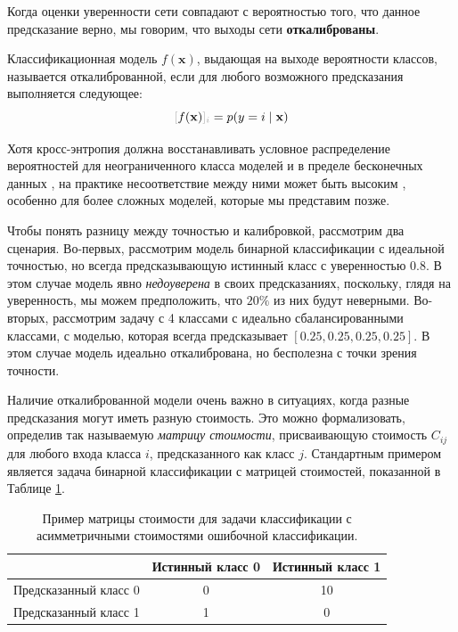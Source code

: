 Когда оценки уверенности сети совпадают с вероятностью того, что данное предсказание верно, мы говорим, что выходы сети \textbf{откалиброваны}.

\begin{definition}[Калибровка]
Классификационная модель $f(\mathbf{x})$, выдающая на выходе вероятности классов, называется откалиброванной, если для любого возможного предсказания выполняется следующее:
%
$$
\idx{f(\mathbf{x})}{i} = p(y=i \;\vert\; \mathbf{x})
$$
%
\end{definition}

Хотя кросс-энтропия должна восстанавливать условное распределение вероятностей для неограниченного класса моделей и в пределе бесконечных данных \cite{hastie2009elements}, на практике несоответствие между ними может быть высоким \cite{blasiok2024does}, особенно для более сложных моделей, которые мы представим позже.

Чтобы понять разницу между точностью и калибровкой, рассмотрим два сценария. Во-первых, рассмотрим модель бинарной классификации с идеальной точностью, но всегда предсказывающую истинный класс с уверенностью $0.8$. В этом случае модель явно \textit{недоуверена} в своих предсказаниях, поскольку, глядя на уверенность, мы можем предположить, что $20\%$ из них будут неверными. Во-вторых, рассмотрим задачу с 4 классами с идеально сбалансированными классами, с моделью, которая всегда предсказывает $[0.25, 0.25, 0.25, 0.25]$. В этом случае модель идеально откалибрована, но бесполезна с точки зрения точности.

Наличие откалиброванной модели очень важно в ситуациях, когда разные предсказания могут иметь разную стоимость. Это можно формализовать, определив так называемую \textit{матрицу стоимости}, присваивающую стоимость $C_{ij}$ для любого входа класса $i$, предсказанного как класс $j$. Стандартным примером является задача бинарной классификации с матрицей стоимостей, показанной в Таблице \ref{tab:cost_matrix}.

%
\begin{table}[h]
\centering
\caption{Пример матрицы стоимости для задачи классификации с асимметричными стоимостями ошибочной классификации.}
\label{tab:cost_matrix}
\begin{tabular}{@{}lcc@{}}
\toprule
 & Истинный класс 0 & Истинный класс 1 \\ \midrule
Предсказанный класс 0 & 0 & 10 \\
Предсказанный класс 1 & 1 & 0 \\ \bottomrule
\end{tabular}
\end{table}

